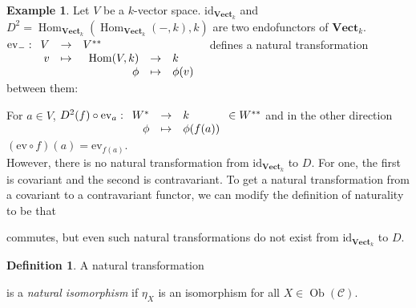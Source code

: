 \documentclass{article}
\newcommand{\id}{\mathrm{id}}
\newcommand{\cat}{\mathcal{C}}
\newcommand{\catt}{\mathcal{D}}
\newcommand{\Vectcat}{\mathbf{Vect}}
\DeclareMathOperator{\Ob}{Ob}
\DeclareMathOperator{\Hom}{Hom}
\newcommand{\applic}[4]{\begin{array}[t]{rcl}
#1 & \to & #2 \\
#3 & \mapsto & #4
\end{array}}
\theoremstyle{plain}
\theoremstyle{definition}
\newtheorem{definition}[theorem]{Definition}
\newtheorem{example}[theorem]{Example}
\theoremstyle{remark}
\begin{document}
\begin{example}
    Let $V$ be a $k$-vector space. $\id_{\mathbf{Vect}_k}$ and $D^2 = \Hom_{\mathbf{Vect}_k}(\Hom_{\mathbf{Vect}_k}(-,k),k)$ are two endofunctors of $\mathbf{Vect}_k$. $\mathrm{ev}_- : \applic{V}{V^{**}}{v}{\applic{\Hom(V,k)}{k}{\phi}{\phi(v)}}$ defines a natural transformation between them:
    \begin{center}
    \end{center}
    For $a \in V$, $D^2 (f) \circ \mathrm{ev}_a : \applic{W^*}{k}{\phi}{\phi(f(a))} \in W^{**}$ and in the other direction $(\mathrm{ev} \circ f)(a) = \mathrm{ev}_{f(a)}$. \\
    However, there is no natural transformation from $\id_{\Vectcat_k}$ to $D$. For one, the first is covariant and the second is contravariant. To get a natural transformation from a covariant to a contravariant functor, we can modify the definition of naturality to be that 
    commutes, but even such natural transformations do not exist from $\id_{\Vectcat_k}$ to $D$.
\end{example}

\begin{definition}
    A natural transformation  is a \emph{natural isomorphism} if $\eta_X$ is an isomorphism for all $X \in \Ob(\cat)$.
\end{definition}
\end{document}

